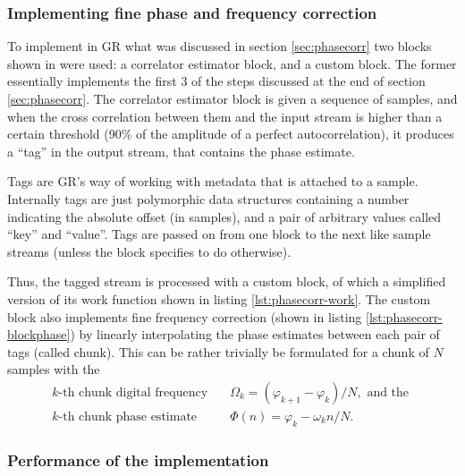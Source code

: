 \subsubsection{Implementing fine phase and frequency correction} \label{sec:implement-phasecorr}

To implement in GR what was discussed in section \ref{sec:phasecorr} two blocks shown in  were used: a correlator estimator block, and a custom block. The former essentially implements the first 3 of the steps discussed at the end of section \ref{sec:phasecorr}. The correlator estimator block is given a sequence of samples, and when the cross correlation between them and the input stream is higher than a certain threshold (90\% of the amplitude of a perfect autocorrelation), it produces a ``tag'' in the output stream, that contains the phase estimate.

Tags are GR's way of working with metadata that is attached to a sample. Internally tags are just polymorphic data structures containing a number indicating the absolute offset (in samples), and a pair of arbitrary values called ``key'' and ``value''. Tags are passed on from one block to the next like sample streams (unless the block specifies to do otherwise).

Thus, the tagged stream is processed with a custom block, of which a simplified version of its work function shown in listing \ref{lst:phasecorr-work}. The custom block also implements fine frequency correction (shown in listing \ref{lst:phasecorr-blockphase}) by linearly interpolating the phase estimates between each pair of tags (called chunk). This can be rather trivially be formulated for a chunk of \(N\) samples with the
\begin{subequations}
	\begin{align}
		k\text{-th chunk digital frequency} \quad  & \Omega_k = (\varphi_{k+1} - \varphi_k) / N, \text{ and the }\\
		k\text{-th chunk phase estimate} \quad & \Phi(n) = \varphi_k - \omega_k n/N.
	\end{align}
\end{subequations}

\subsubsection{Performance of the implementation}\label{sec:preforming-implementation}

